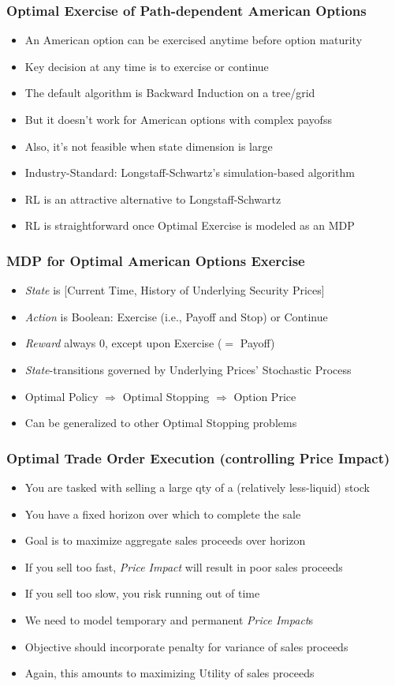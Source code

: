 \documentclass[handout]{beamer}
\begin{document}
\begin{frame}
\frametitle{Optimal Exercise of Path-dependent American Options}
\pause
\begin{itemize}[<+->]
\item An American option can be exercised anytime before option maturity
\item Key decision at any time is to exercise or continue
\item The default algorithm is Backward Induction on a tree/grid
\item But it doesn't work for American options with complex payofss 
\item Also, it's not feasible when state dimension is large
\item Industry-Standard: Longstaff-Schwartz's simulation-based algorithm
\item RL is an attractive alternative to Longstaff-Schwartz
\item RL is straightforward once Optimal Exercise is modeled as an MDP
\end{itemize}
\end{frame}

\begin{frame}
\frametitle{MDP for Optimal American Options Exercise}
\pause
\begin{itemize}[<+->]
\item {\em State} is [Current Time, History of Underlying Security Prices]
\item {\em Action} is Boolean: Exercise (i.e., Payoff and Stop) or Continue
\item {\em Reward} always 0, except upon Exercise ($=$ Payoff)
\item {\em State}-transitions governed by Underlying Prices' Stochastic Process
\item Optimal Policy $\Rightarrow$ Optimal Stopping $\Rightarrow$ Option Price
\item Can be generalized to other Optimal Stopping problems
\end{itemize}
\end{frame}

\begin{frame}
\frametitle{Optimal Trade Order Execution (controlling Price Impact)}
\pause
\begin{itemize}[<+->]
\item You are tasked with selling a large qty of a (relatively less-liquid) stock
\item You have a fixed horizon over which to complete the sale
\item Goal is to maximize aggregate sales proceeds over horizon
\item If you sell too fast, {\em Price Impact} will result in poor sales proceeds
\item If you sell too slow, you risk running out of time
\item We need to model temporary and permanent {\em Price Impact}s
\item Objective should incorporate penalty for variance of sales proceeds
\item Again, this amounts to maximizing Utility of sales proceeds
\end{itemize}
\end{frame}
\end{document}
